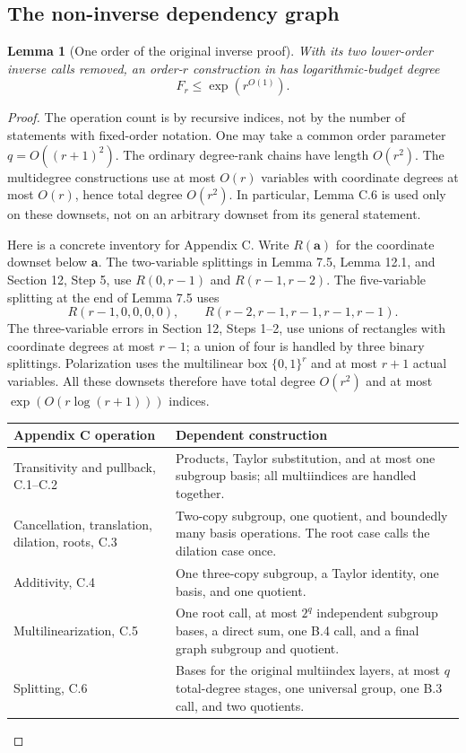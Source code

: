 \documentclass[11pt,a4paper]{article}
\newtheorem{lemma}[theorem]{Lemma}
\theoremstyle{definition}
\begin{document}
\subsection{The non-inverse dependency graph}

\begin{lemma}[One order of the original inverse proof]\label{lem:external-body}
With its two lower-order inverse calls removed, an order-\(r\)
construction in \cite{lss} has logarithmic-budget degree
\[
 F_r\le\exp(r^{O(1)}).
\]
\end{lemma}

\begin{proof}
The operation count is by recursive indices, not by the number of
statements with fixed-order notation. One may take a common order
parameter \(q=O((r+1)^2)\). The ordinary degree-rank chains have
length \(O(r^2)\). The multidegree constructions use at most
\(O(r)\) variables with coordinate degrees at most \(O(r)\), hence
total degree \(O(r^2)\). In particular, Lemma C.6 is used only on
these downsets, not on an arbitrary downset from its general statement.

Here is a concrete inventory for Appendix C. Write \(R(\mathbf a)\)
for the coordinate downset below \(\mathbf a\). The two-variable
splittings in Lemma 7.5, Lemma 12.1, and Section 12, Step 5, use
\(R(0,r-1)\) and \(R(r-1,r-2)\). The five-variable splitting at
the end of Lemma 7.5 uses
\[
 R(r-1,0,0,0,0),\qquad R(r-2,r-1,r-1,r-1,r-1).
\]
The three-variable errors in Section 12, Steps 1--2, use unions of
rectangles with coordinate degrees at most \(r-1\); a union of
four is handled by three binary splittings. Polarization uses the
multilinear box \(\{0,1\}^r\) and at most \(r+1\) actual variables.
All these downsets therefore have total degree \(O(r^2)\) and at
most \(\exp(O(r\log(r+1)))\) indices.

\begin{center}
\small
\begin{tabularx}{\linewidth}{@{}p{.25\linewidth}X@{}}
\toprule
Appendix C operation & Dependent construction \\
\midrule
Transitivity and pullback, C.1--C.2 &
Products, Taylor substitution, and at most one subgroup basis; all
multiindices are handled together.\\[3pt]
Cancellation, translation, dilation, roots, C.3 &
Two-copy subgroup, one quotient, and boundedly many basis operations.
The root case calls the dilation case once.\\[3pt]
Additivity, C.4 &
One three-copy subgroup, a Taylor identity, one basis, and one quotient.\\[3pt]
Multilinearization, C.5 &
One root call, at most \(2^q\) independent subgroup bases, a direct
sum, one B.4 call, and a final graph subgroup and quotient.\\[3pt]
Splitting, C.6 &
Bases for the original multiindex layers, at most \(q\) total-degree
stages, one universal group, one B.3 call, and two quotients.\\
\bottomrule
\end{tabularx}
\end{center}


\end{proof}
\end{document}

